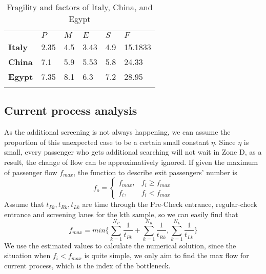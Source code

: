 \documentclass{mcmthesis}
\newlength\savedwidth
\newcommand\whline{\noalign{\global\savedwidth\arrayrulewidth
                            \global\arrayrulewidth 1.2pt}%
                   \hline
                   \noalign{\global\arrayrulewidth\savedwidth}}
\newlength\savewidth
\newcommand\shline{\noalign{\global\savewidth\arrayrulewidth
                            \global\arrayrulewidth 1.2pt}%
                   \hline
                   \noalign{\global\arrayrulewidth\savewidth}}
\begin{document}
\begin{table}[htbp]
	\renewcommand\arraystretch{1.5}
	\footnotesize
	\centering
	\begin{tabular}{m{2cm}<{\centering}|m{2cm}<{\centering}|m{2cm}<{\centering}|m{2cm}<{\centering}|m{2cm}<{\centering}|m{2cm}<{\centering}}
		\whline
		&\textbf{$P$}&\textbf{$M$}&\textbf{$E$}&\textbf{$S$}&\textbf{$F$}\\
		\whline
		\textbf{Italy}& 2.35 & 4.5 & 3.43 & 4.9 & 15.1833\\
		
		\textbf{China}& 7.1 & 5.9 & 5.53 & 5.8 & 24.33\\
		
		\textbf{Egypt}& 7.35 & 8.1 & 6.3 & 7.2 & 28.95\\

		\shline
	\end{tabular}
	\caption{Fragility and factors of Italy, China, and Egypt}\label{tab:Fragility and factors of Italy, China, and Egypt}
\end{table}


\subsection{Current process analysis}
As the additional screening is not always happening, we can assume the proportion of this unexpected case to be a certain small constant $\eta$. Since $\eta$ is small, every passenger who gets additional searching will not wait in Zone D, as a result, the change of flow can be approximatively ignored. If given the maximum of passenger flow $f_{max}$, the function to describe exit passengers' number is
\begin{equation}
    f_{o}=
   \begin{cases}
   f_{max}, &\mbox{$f_i \geq f_{max}$}\\
   f_i, &\mbox{$f_i < f_{max}$}
   \end{cases}
\end{equation}
Assume that $t_{Pk}, t_{Rk}, t_{Lk}$ are time through the Pre-Check entrance, regular-check entrance and screening lanes for the kth sample, so we can easily find that 
$$f_{max}=min\{\sum_{k=1}^{N_P}\frac{1}{t_{Pk}}+\sum_{k=1}^{N_R}\frac{1}{t_{Rk}},\sum_{k=1}^{N_L}\frac{1}{t_{Lk}}\}$$
We use the estimated values to calculate the numerical solution, since the situation when $f_i<f_{max}$ is quite simple, we only aim to find the max flow for current process, which is the index of the bottleneck.
\end{document}
